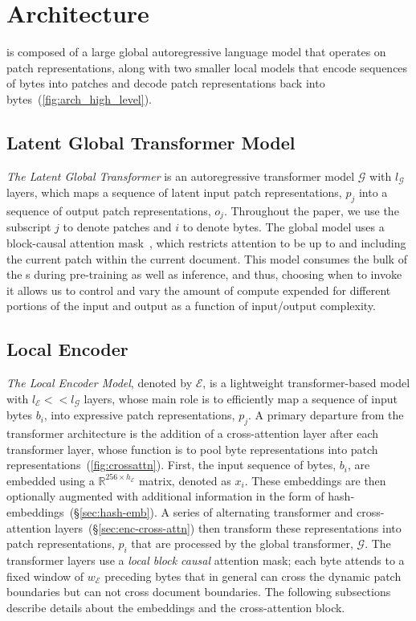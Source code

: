 \documentclass[]{fairmeta}
\begin{document}
\section{\model{} Architecture}
\label{section:architecture}
\model{} is composed of a large global autoregressive language model that operates on patch representations, along with two smaller local models that encode sequences of bytes into patches and decode patch representations back into bytes~(\autoref{fig:arch_high_level}). 



\subsection{Latent Global Transformer Model}

\textit{The Latent Global Transformer} is an autoregressive transformer model $\mathcal{G}$ with $l_{\mathcal{G}}$ layers, which maps a sequence of latent input patch representations, $p_j$ into a sequence of output patch representations, $o_j$. Throughout the paper, we use the subscript $j$ to denote patches and $i$ to denote bytes. The global model uses a block-causal attention mask~\citep{dubey2024llama}, which restricts attention to be up to and including the current patch  within the current document. This model consumes the bulk of the \flop{}s during pre-training as well as inference, and thus, choosing when to invoke it allows us to control and vary the amount of compute expended for different portions of the input and output as a function of input/output complexity.

\subsection{Local Encoder}
\label{section:local}

\textit{The Local Encoder Model}, denoted by $\mathcal{E}$, is a lightweight transformer-based model with $l_{\mathcal{E}} << l_{\mathcal{G}}$ layers, whose main role is to efficiently map a sequence of input bytes $b_i$, into expressive patch representations, $p_j$.
A primary departure from the transformer architecture is the addition of a cross-attention layer after each transformer layer, whose function is to pool byte representations into patch representations~(\autoref{fig:crossattn}).
First, the input sequence of bytes, $b_i$, are embedded using a $\mathbb{R}^{256 \times h_{\mathcal{E}}}$ matrix, denoted as $x_i$.
These embeddings are then optionally augmented with additional information in the form of hash-embeddings~(\S\ref{sec:hash-emb}).
A series of alternating transformer and cross-attention layers~(\S\ref{sec:enc-cross-attn}) then transform these representations into patch representations, $p_i$ that are processed by the global transformer, $\mathcal{G}$.
The transformer layers use a \textit{local block causal} attention mask; each byte attends to a fixed window of $w_{\mathcal{E}}$ preceding bytes that in general can cross the dynamic patch boundaries but can not cross document boundaries.
The following subsections describe details about the embeddings and the cross-attention block.
\end{document}
